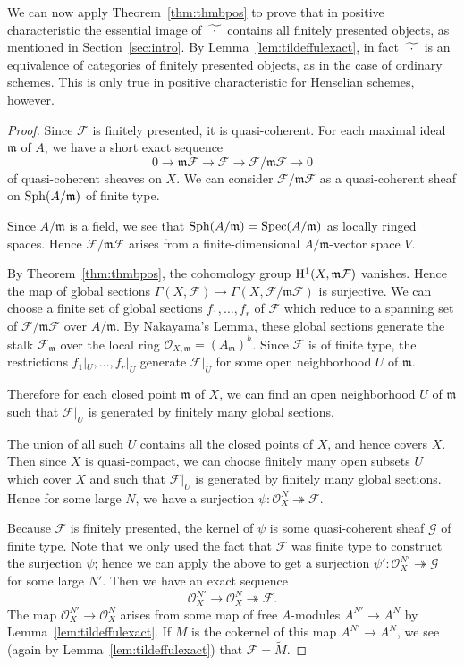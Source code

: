 \documentclass[12pt]{article}
\renewcommand{\O}{\mathscr{O}}
\newcommand{\F}{\mathcal{F}}
\newcommand{\G}{\mathcal{G}}
\newcommand{\spec}{{\rm Spec}}
\newcommand{\sph}{{\rm Sph}}
\newcommand{\mf}[1]{\mathfrak{#1}}
\renewcommand{\H}{{\rm H}}
\theoremstyle{definition}
\numberwithin{equation}{subsection}
\begin{document}
We can now apply Theorem~\ref{thm:thmbpos} to prove that in positive characteristic the essential image of $\fwt$ contains all finitely presented objects, as mentioned in Section~\ref{sec:intro}. By Lemma~\ref{lem:tildeffulexact}, in fact $\fwt$ is an equivalence of categories of finitely presented objects, as in the case of ordinary schemes. This is only true in positive characteristic for Henselian schemes, however.

\thmniceqcoh

\begin{proof} Since $\F$ is finitely presented, it is quasi-coherent. For each maximal ideal $\mf{m}$ of $A$, we have a short exact sequence $$0 \to \mf{m}\F \to \F \to \F/\mf{m}\F \to 0$$ of quasi-coherent sheaves on $X$. We can consider $\F/\mf{m}\F$ as a quasi-coherent sheaf on $\sph(A/\mf{m})$ of finite type. 

Since $A/\mf{m}$ is a field, we see that $\sph(A/\mf{m})=\spec(A/\mf{m})$ as locally ringed spaces. Hence $\F/\mf{m}\F$ arises from a finite-dimensional $A/\mf{m}$-vector space $V$. 

By Theorem~\ref{thm:thmbpos}, the cohomology group $\H^1(X,\mf{m}\F)$ vanishes. Hence the map of global sections $\Gamma(X,\F) \to \Gamma(X,\F/\mf{m}\F)$ is surjective. We can choose a finite set of global sections $f_1,\dots,f_r$ of $\F$ which reduce to a spanning set of $\F/\mf{m}\F$ over $A/\mf{m}$. By Nakayama's Lemma, these global sections generate the stalk $\F_{\mf{m}}$ over the local ring $\O_{X,\mf{m}}=(A_{\mf{m}})^h$. Since $\F$ is of finite type, the restrictions $f_1|_{U},\dots,f_r|_{U}$ generate $\F|_U$ for some open neighborhood $U$ of $\mf{m}$. 

Therefore for each closed point $\mf{m}$ of $X$, we can find an open neighborhood $U$ of $\mf{m}$ such that $\F|_U$ is generated by finitely many global sections. 

The union of all such $U$ contains all the closed points of $X$, and hence covers $X$. Then since $X$ is quasi-compact, we can choose finitely many open subsets $U$ which cover $X$ and such that $\F|_U$ is generated by finitely many global sections. Hence for some large $N$, we have a surjection $\psi:\O_{X}^N \twoheadrightarrow \F$. 

Because $\F$ is finitely presented, the kernel of $\psi$ is some quasi-coherent sheaf $\G$ of finite type. Note that we only used the fact that $\F$ was finite type to construct the surjection $\psi$; hence we can apply the above to get a surjection $\psi': \O_{X}^{N'} \twoheadrightarrow \G$ for some large $N'$. Then we have an exact sequence $$\O_{X}^{N'} \to \O_{X}^N \twoheadrightarrow \F.$$ The map $\O_{X}^{N'} \to \O_{X}^N$ arises from some map of free $A$-modules $A^{N'} \to A^N$ by Lemma~\ref{lem:tildeffulexact}. If $M$ is the cokernel of this map $A^{N'} \to A^N$, we see (again by Lemma~\ref{lem:tildeffulexact}) that $\F = \widetilde{M}$. \end{proof}
\end{document}
